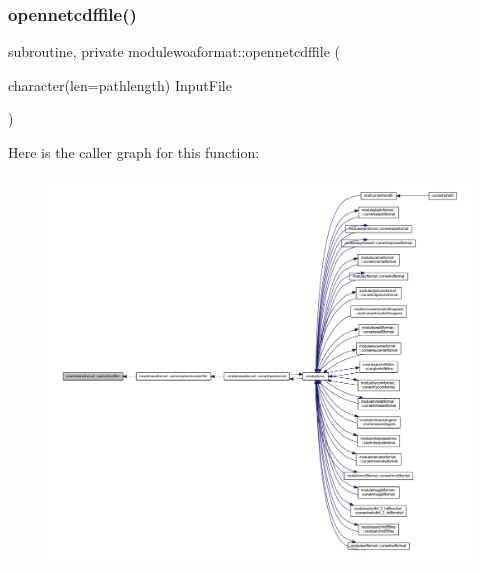 \mbox{\label{namespacemodulewoaformat_a77c643507a170a9ebd07fd0cbb9616f8}} 
\subsubsection{\texorpdfstring{opennetcdffile()}{opennetcdffile()}}
{\footnotesize\ttfamily subroutine, private modulewoaformat\+::opennetcdffile (\begin{DoxyParamCaption}\item[{character(len=pathlength)}]{Input\+File }\end{DoxyParamCaption})\hspace{0.3cm}{\ttfamily [private]}}

Here is the caller graph for this function\+:\nopagebreak
\begin{figure}[H]
\begin{center}
\leavevmode
\includegraphics[width=350pt]{namespacemodulewoaformat_a77c643507a170a9ebd07fd0cbb9616f8_icgraph}
\end{center}
\end{figure}
\mbox{\label{namespacemodulewoaformat_a35891daf8ac8bd662f8f59f673e72cfe}} 

